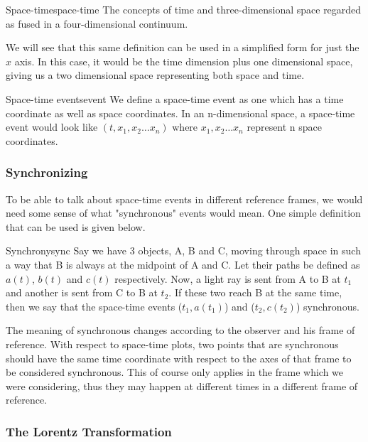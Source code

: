 \documentclass[16pt]{scrartcl}
\numberwithin{equation}{section}
\theoremstyle{plain}
\theoremstyle{definition}
\begin{document}
\begin{defn}{Space-time}{space-time}
    The concepts of time and three-dimensional space regarded as fused in a four-dimensional continuum.
\end{defn}

We will see that this same definition can be used in a simplified form for just the $x$ axis. In this case, it would be the time dimension plus one dimensional space, giving us a two dimensional space representing both space and time.

\begin{defn}{Space-time events}{event}
    We define a space-time event as one which has a time coordinate as well as space coordinates. In an n-dimensional space, a space-time event would look like $(t,x_1,x_2 \dots x_n)$ where $x_1,x_2 \dots x_n$ represent n space coordinates.
\end{defn}

\subsubsection{Synchronizing}

To be able to talk about space-time events in different reference frames, we would need some sense of what "synchronous" events would mean. One simple definition that can be used is given below.

\begin{defn}{Synchrony}{sync}
    Say we have 3 objects, A, B and C, moving through space in such a way that B is always at the midpoint of A and C. Let their paths be defined as $a(t)$, $b(t)$ and $c(t)$ respectively. Now, a light ray is sent from A to B at $t_1$ and another is sent from C to B at $t_2$. If these two reach B at the same time, then we say that the space-time events ($t_1, a(t_1)$) and ($t_2, c(t_2)$) synchronous.
\end{defn}

The meaning of synchronous changes according to the observer and his frame of reference. With respect to space-time plots, two points that are synchronous should have the same time coordinate with respect to the axes of that frame to be considered synchronous. This of course only applies in the frame which we were considering, thus they may happen at different times in a different frame of reference.

\subsubsection{The Lorentz Transformation}
\end{document}
